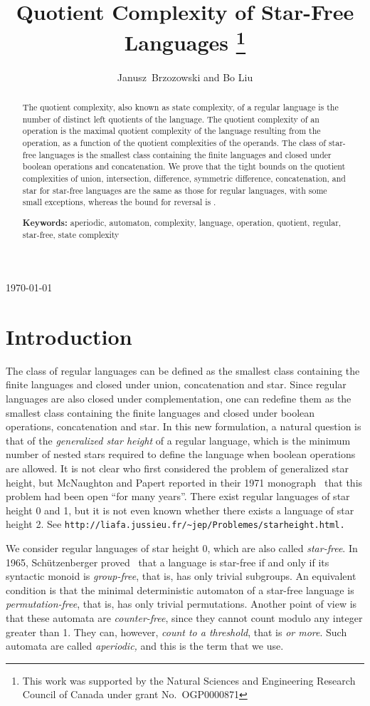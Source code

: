 \documentclass{llncs}
\title{Quotient Complexity of Star-Free Languages
\thanks{This work was supported by the Natural Sciences and Engineering Research Council of Canada under grant No.~OGP0000871
}
}
\author{Janusz~Brzozowski and Bo Liu
 }
\institute{David R. Cheriton School of Computer Science, University of Waterloo, \\
Waterloo, ON, Canada N2L 3G1\\
\{ {\tt brzozo, b23liu} \}{\tt @uwaterloo.ca} 
}
\newcommand{\noin}{\noindent}
\begin{document}
\maketitle
\today
\begin{abstract}
The quotient complexity, also known as state complexity, of a regular language is the number of distinct left quotients of the language.
The quotient complexity of an operation is the maximal quotient complexity of the language resulting from the operation, as a function of the quotient complexities of the operands.
The class of star-free languages is the smallest class  containing the  finite languages and closed under boolean operations and concatenation.
We prove that the tight bounds on the quotient complexities of union, intersection, difference,  symmetric difference, concatenation, and star  for star-free languages are the same as those for regular languages, with some small exceptions, whereas the bound for reversal is .
\bigskip

\noin
{\bf Keywords:}
aperiodic, automaton,  complexity,  language,  operation, quotient, regular, star-free, state complexity
\end{abstract}


\section{Introduction}

The class of regular languages can be defined as the smallest class containing the finite languages and closed under union, concatenation and star. Since regular languages are also closed under complementation, one can redefine them as the smallest class containing the finite languages and closed under boolean operations, concatenation and star. In this new formulation, a natural question is that of the \emph{generalized star height} of a regular language, which is the minimum number of nested stars required to define the language when boolean operations are allowed. 
It is not clear who first considered the problem of generalized star height, but McNaughton and Papert reported in their 1971 monograph~\cite{McPa71} that this problem had been open ``for many years''.
There exist regular languages of star height 0 and 1, but it is not even known whether there exists a language of star height 2. See 
{\small\tt http://liafa.jussieu.fr/\~{}jep/Problemes/starheight.html.}



We consider regular languages of star height 0, which are also called \emph{star-free}. 
In 1965, Sch\"utzenberger proved~\cite{Sch65} that a language is star-free if and only if its syntactic monoid is \emph{group-free}, that is, has only trivial subgroups. An equivalent condition is that the minimal deterministic automaton of a star-free language is \emph{permutation-free}, that is, has only trivial permutations. Another point of view is that these automata are \emph{counter-free}, since they cannot count modulo any integer greater than 1. They can, however, \emph{count to a threshold}, that is  \emph{or more}.
Such automata are called \emph{aperiodic,} and this is the term that we use.
\end{document}
